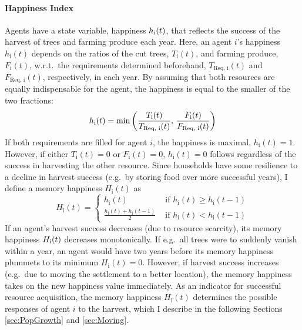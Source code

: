 \paragraph{Happiness Index}
Agents have a state variable, happiness $h_{\rm i}(t)$, that reflects the success of the harvest of trees and farming produce each year.
Here, an agent $i$'s happiness $h_\text{i}(t)$ depends on the ratios of the cut trees, $T_\text{i}(t)$, and farming produce, $F_\text{i}(t)$, w.r.t.\ the requirements determined beforehand, $T_\text{Req, i}(t)$ and $F_\text{Req, i}(t)$, respectively, in each year.
By assuming that both resources are equally indispensable for the agent, the happiness is equal to the smaller of the two fractions:
\begin{equation} 
h_\text{i}(t) = {\rm min} \left( \frac{T_\text{i}(t)}{T_\text{Req, i}(t)}, \, \frac{F_\text{i}(t)}{F_\text{Req, i}(t)} \right)
\label{eq:h_i}
\end{equation}
If both requirements are filled for agent $i$, the happiness is maximal,  $h_\text{i}(t)=1$.
However, if either $T_\text{i}(t)=0$ or $F_\text{i}(t)=0$, $h_\text{i}(t)=0$ follows regardless of the success in harvesting the other resource.
Since households have some resilience to a decline in harvest success (e.g.\ by storing food over more successful years), I define a memory happiness $H_\text{i}(t)$ as
\begin{equation}
H_\text{i}(t) = \begin{cases} 
				h_\text{i}(t) & \text{ if } h_\text{i}(t)\geq h_\text{i}(t-1) \\
				\frac{h_\text{i}(t) + h_\text{i}(t-1)}{2} & \text{ if } h_\text{i}(t)<h_\text{i}(t-1) 
		\end{cases}
\end{equation}
If an agent's harvest success decreases (due to resource scarcity), its memory happiness $H_{\rm i}(t)$ decreases monotonically.
If e.g.\ all trees were to suddenly vanish within a year, an agent would have two years before its memory happiness plummets to its minimum $H_\text{i}(t) = 0$.
However, if harvest success increases (e.g.\ due to moving the settlement to a better location), the memory happiness takes on the new happiness value immediately.
As an indicator for successful resource acquisition, the memory happiness $H_\text{i}(t)$ determines the possible responses of agent $i$ to the harvest, which I describe in the following Sections \ref{sec:PopGrowth} and \ref{sec:Moving}.


